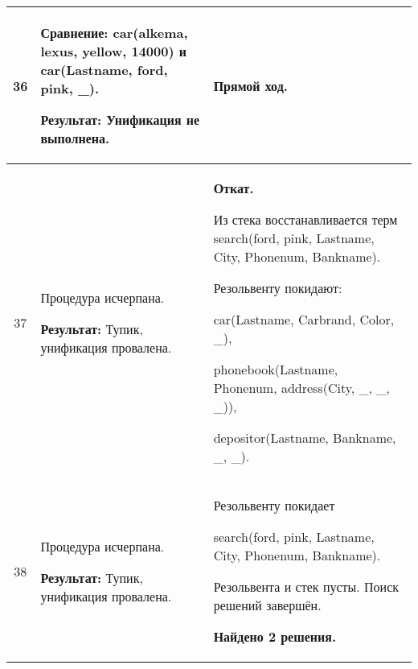 \begin{longtable}{|c|p{}|p{}|}
    36
                       &
\textbf{Сравнение:} \newline
  car(alkema, lexus,   yellow, 14000)
    \newline и \newline
    car(Lastname, ford, pink, \_).
    \newline

    \textbf{Результат:} \newline
    Унификация не выполнена.
                       &
    \textbf{Прямой ход.}
                       \\ \hline

    37
                       &
    Процедура исчерпана.
    \newline

    \textbf{Результат:} \newline
    Тупик, унификация провалена.
                       &
    \textbf{Откат.}
    \newline

    Из стека восстанавливается терм \newline
    search(ford, pink, Lastname, City, Phonenum, Bankname).
    \newline

    Резольвенту покидают:

    car(Lastname, Carbrand, Color, \_),

    phonebook(Lastname, Phonenum, address(City, \_, \_, \_)),

    depositor(Lastname, Bankname, \_, \_).
                       \\ \hline

    38
                       &
    Процедура исчерпана.
    \newline

    \textbf{Результат:} \newline
    Тупик, унификация провалена.
                       &
    Резольвенту покидает

    search(ford, pink, Lastname, City, Phonenum, Bankname).
    \newline

    Резольвента и стек пусты. Поиск решений завершён.

    \textbf{Найдено 2 решения.}
                       \\ \hline
\end{longtable}
\normalsize

